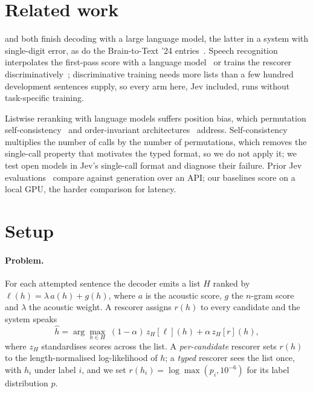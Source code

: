 \documentclass[11pt]{article}
\begin{document}
\section{Related work}
\label{sec:related}

\citet{willett2023} and \citet{card2024} both finish decoding with a large language model, the
latter in a system with single-digit error, as do the Brain-to-Text '24 entries~\citep{b2t24}.
Speech recognition
interpolates the first-pass score with a language model~\citep{udagawa2022} or trains the rescorer
discriminatively~\citep{xu2022rescorebert,shivakumar2023disc,yu2023lora}; discriminative training
needs more lists than a few hundred development sentences supply, so every arm here, Jev included,
runs without task-specific training.

Listwise reranking with language models suffers position bias,
which permutation self-consistency~\citep{tang2023psc} and order-invariant
architectures~\citep{bito2026invarirank} address. Self-consistency multiplies the number of calls by the
number of permutations, which removes the single-call property that motivates the typed format, so
we do not apply it; we test open models in Jev's single-call format and diagnose their failure. Prior Jev evaluations~\citep{li2026edge,ibrahim2026annotation} compare
against generation over an API; our baselines score on a local GPU, the harder comparison for
latency.

\section{Setup}
\label{sec:setup}

\paragraph{Problem.} For each attempted sentence the decoder emits a list $H$ ranked by
$\ell(h) = \lambda\, a(h) + g(h)$, where $a$ is the acoustic score, $g$ the $n$-gram score and
$\lambda$ the acoustic weight. A rescorer assigns $r(h)$ to every candidate and the system speaks
\begin{equation}
  \hat h = \arg\max_{h \in H}\; (1-\alpha)\, z_H[\ell](h) + \alpha\, z_H[r](h),
\end{equation}
where $z_H$ standardises scores across the list. A \emph{per-candidate} rescorer sets $r(h)$ to the
length-normalised log-likelihood of $h$; a \emph{typed} rescorer sees the list once, with $h_i$ under
label $i$, and we set $r(h_i) = \log \max(p_i, 10^{-6})$ for its label distribution $p$.
\end{document}
